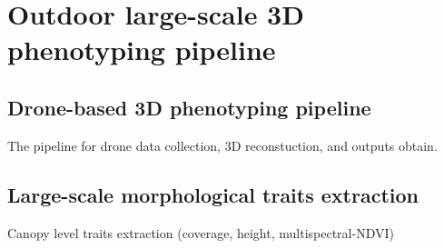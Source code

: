 \chapter{Outdoor large-scale 3D phenotyping pipeline}

\section{Drone-based 3D phenotyping pipeline}

The pipeline for drone data collection, 3D reconstuction, and outputs obtain.


\section{Large-scale morphological traits extraction}

Canopy level traits extraction (coverage, height, multispectral-NDVI)

\newpage


\newpage

